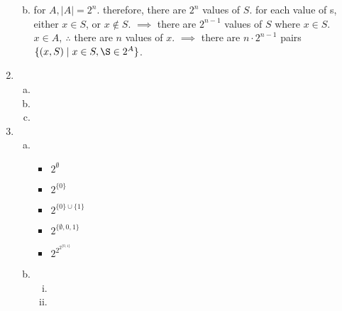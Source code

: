 \documentclass{article}
\begin{document}
\begin{enumerate}
\begin{enumerate}[(a)]
\begin{itemize}
    \end{itemize}
    \item %
          for $A, |A|=2^{n}$. therefore, there are $2^{n}$ values of $S$. for each value of s, either $x\in S$, or $x\notin S$. $\implies$ there are $2^{n-1}$ values of $S$ where $x\in S$. $x\in A,\ \therefore$ there are $n$ values of $x$. $\implies$ there are $n\cdot2^{n-1}$ pairs $\{(x,S)\mid x\in S,\S\in2^{A}\}$.
  \end{enumerate}

  \item
  \begin{enumerate}[(a)]
    \item %

    \item %

    \item %

  \end{enumerate}

  \item
  \begin{enumerate}[(a)]
    \item %
    \begin{itemize}
      \item $2^{\emptyset}$

      \item $2^{\{0\}}$

      \item $2^{\{0\} \cup \{1\}}$

      \item $2^{\{\emptyset, 0, 1\}}$

      \item $2^{2^{2^{\{0,1\}}}}$

    \end{itemize}

    \item %
    \begin{enumerate}[(i)]
      \item %

      \item %

    \end{enumerate}

  \end{enumerate}
\end{enumerate}
\end{document}

